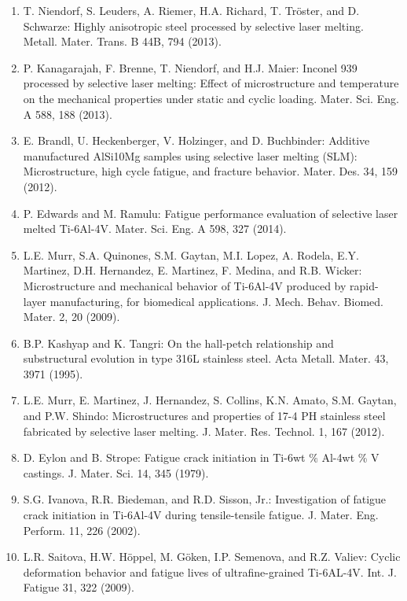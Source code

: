 \documentclass[10pt]{article}
\begin{document}
\begin{enumerate}
  \item T. Niendorf, S. Leuders, A. Riemer, H.A. Richard, T. Tröster, and D. Schwarze: Highly anisotropic steel processed by selective laser melting. Metall. Mater. Trans. B 44B, 794 (2013).

  \item P. Kanagarajah, F. Brenne, T. Niendorf, and H.J. Maier: Inconel 939 processed by selective laser melting: Effect of microstructure and temperature on the mechanical properties under static and cyclic loading. Mater. Sci. Eng. A 588, 188 (2013).

  \item E. Brandl, U. Heckenberger, V. Holzinger, and D. Buchbinder: Additive manufactured AlSi10Mg samples using selective laser melting (SLM): Microstructure, high cycle fatigue, and fracture behavior. Mater. Des. 34, 159 (2012).

  \item P. Edwards and M. Ramulu: Fatigue performance evaluation of selective laser melted Ti-6Al-4V. Mater. Sci. Eng. A 598, 327 (2014).

  \item L.E. Murr, S.A. Quinones, S.M. Gaytan, M.I. Lopez, A. Rodela, E.Y. Martinez, D.H. Hernandez, E. Martinez, F. Medina, and R.B. Wicker: Microstructure and mechanical behavior of Ti-6Al-4V produced by rapid-layer manufacturing, for biomedical applications. J. Mech. Behav. Biomed. Mater. 2, 20 (2009).

  \item B.P. Kashyap and K. Tangri: On the hall-petch relationship and substructural evolution in type 316L stainless steel. Acta Metall. Mater. 43, 3971 (1995).

  \item L.E. Murr, E. Martinez, J. Hernandez, S. Collins, K.N. Amato, S.M. Gaytan, and P.W. Shindo: Microstructures and properties of 17-4 PH stainless steel fabricated by selective laser melting. J. Mater. Res. Technol. 1, 167 (2012).

  \item D. Eylon and B. Strope: Fatigue crack initiation in Ti-6wt $\%$ Al-4wt \% V castings. J. Mater. Sci. 14, 345 (1979).

  \item S.G. Ivanova, R.R. Biedeman, and R.D. Sisson, Jr.: Investigation of fatigue crack initiation in Ti-6Al-4V during tensile-tensile fatigue. J. Mater. Eng. Perform. 11, 226 (2002).

  \item L.R. Saitova, H.W. Höppel, M. Göken, I.P. Semenova, and R.Z. Valiev: Cyclic deformation behavior and fatigue lives of ultrafine-grained Ti-6AL-4V. Int. J. Fatigue 31, 322 (2009).

\end{enumerate}
\end{document}
